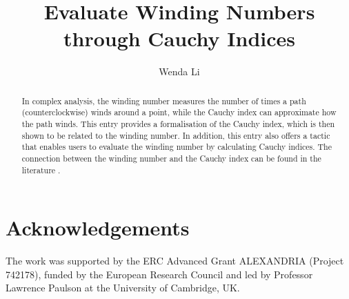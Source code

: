 \documentclass[11pt,a4paper]{article}
\begin{document}
\title{Evaluate Winding Numbers through Cauchy Indices}
\author{Wenda Li}
\maketitle

\begin{abstract}
	In complex analysis, the winding number measures the number of times a path (counterclockwise) winds around a point, while the Cauchy index can approximate how the path winds. This entry provides a formalisation of the Cauchy index, which is then shown to be related to the winding number. In addition, this entry also offers a tactic that enables users to evaluate the winding number by calculating Cauchy indices. The connection between the winding number and the Cauchy index can be found in the literature \cite{eisermann2012fundamental} \cite[Chapter 11]{rahman2002analytic}.
\end{abstract}




\section{Acknowledgements}
The work was supported by the ERC Advanced Grant ALEXANDRIA (Project 742178), funded by the European Research Council
and led by Professor Lawrence Paulson at the University of Cambridge, UK.



\end{document}
